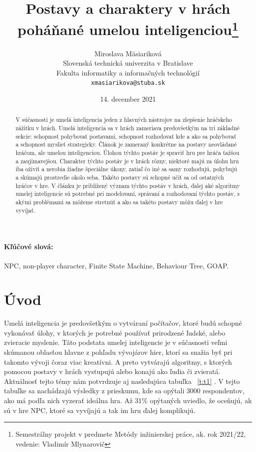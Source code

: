 \documentclass[10pt,twoside,slovak,a4paper]{article}
\title{Postavy a charaktery v hrách poháňané umelou inteligenciou\thanks{Semestrálny projekt v predmete Metódy inžinierskej práce, ak. rok 2021/22, vedenie: Vladimír Mlynarovič}} %
\author{Miroslava Mäsiariková\\[2pt]
	{\small Slovenská technická univerzita v Bratislave}\\
	{\small Fakulta informatiky a informačných technológií}\\
	{\small \texttt{xmasiarikova@stuba.sk}}
	}
\date{\small 14. december 2021} %
\begin{document}
\maketitle

\begin{abstract}

V súčasnosti je umelá inteligencia jeden z hlavných nástrojov na zlepšenie hráčskeho zážitku v hrách. Umelá inteligencia sa v hrách zameriava predovšetkým na tri základné sekcie: schopnosť pohybovať postavami, schopnosť rozhodovať kde a ako sa pohybovať a schopnosť myslieť strategicky. Článok je zameraný  konkrétne na postavy neovládané hráčom, ale umelou inteligenciou. Úlohou týchto postáv je spraviť hru pre hráča ťažšou a zaujímavejšou. Charakter týchto postáv je v hrách rôzny, niektoré majú za úlohu hru iba oživiť a nerobia žiadne špeciálne úkony, zatiaľ čo iné sa samy rozhodujú, pohybujú a skúmajú prostredie okolo seba. Takéto postavy sú schopné učiť sa od ostatných hráčov v hre. V článku je priblížený význam týchto postáv v hrách, ďalej aké algoritmy umelej inteligencie sú potrebné pri modelovaní, správaní a rozhodovaní týchto postáv, s akými problémami sa môžeme stretnúť a ako sa takéto postavy môžu ďalej v hre vyvíjať. 
\end{abstract}

\paragraph{Kľúčové slová:}NPC, non-player character, Finite State Machine, Behaviour Tree, GOAP.

\section{Úvod}

\quad Umelá inteligencia je predovšetkým o vytváraní počítačov, ktoré budú schopné vykonávať úlohy, v ktorých je potrebné používať prirodzené ľudské, alebo zvieracie myslenie. Táto podstata umelej inteligencie je v súčasnosti veľmi skúmanou oblasťou hlavne z pohľadu vývojárov hier, ktorí sa snažia byť pri takomto vývoji čoraz viac kreatívni. A preto vytvárajú algoritmy, s ktorých pomocou postavy v hrách vystupujú alebo konajú ako ľudia či zvieratá. Aktuálnosť tejto témy nám potvrdzuje aj nasledujúca tabuľka ~\ref{t:t1} . V tejto tabuľke sa nachádzajú výsledky z prieskumu, kde sa opýtali 3000 respondentov, ako má podľa nich vyzerať ideálna hra. Až 31\% opýtaných uviedlo, že oceňujú, ak sú v hre NPC, ktoré sa vyvíjajú a tak im hru ďalej komplikujú. 
\end{document}
